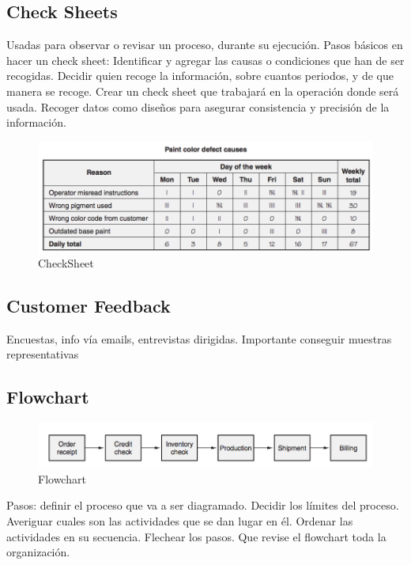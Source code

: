 \documentclass[]{article}
\begin{document}
\subsection{Check Sheets}

Usadas para observar o revisar un proceso, durante su ejecución. Pasos básicos en hacer un check sheet: Identificar y agregar las causas o condiciones que han de ser recogidas. Decidir quien recoge la información, sobre cuantos periodos, y de que manera se recoge. Crear un check sheet que trabajará en la operación donde será usada. Recoger datos como diseños para asegurar consistencia y precisión de la información.

\begin{figure}[ht!]
	\centering
	\includegraphics[width=120mm]{imagenes/CheckSheet.png}
	\caption{CheckSheet}
	\label{fig:CheckSheet}
\end{figure}

\subsection{Customer Feedback}

Encuestas, info vía emails, entrevistas dirigidas. Importante conseguir muestras representativas

\subsection{Flowchart}

\begin{figure}[ht!]
	\centering
	\includegraphics[width=120mm]{imagenes/Flowchart.png}
	\caption{Flowchart}
	\label{fig:Flowchart}
\end{figure}

Pasos: definir el proceso que va a ser diagramado. Decidir los límites del proceso. Averiguar cuales son las actividades que se dan lugar en él. Ordenar las actividades en su secuencia. Flechear los pasos. Que revise el flowchart toda la organización.
\end{document}
